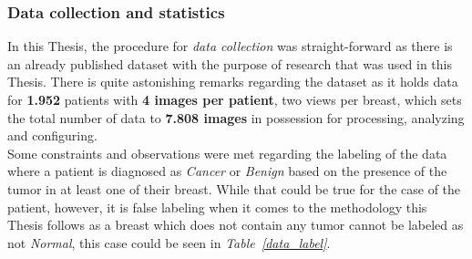 \documentclass[12pt]{extarticle}
\begin{document}
	\subsubsection{Data collection and statistics}\label{Data_collection}
	In this Thesis, the procedure for \emph{data collection} was straight-forward as there is an already published dataset \cite{Dataset} with the purpose of research that was used in this Thesis. There is quite astonishing remarks regarding the dataset as it holds data for \textbf{1.952} patients with \textbf{4 images per patient}, two views per breast, which sets the total number of data to \textbf{7.808 images} in possession for processing, analyzing and configuring.\\[5mm]
	Some constraints and observations were met regarding the labeling of the data where a patient is diagnosed as \emph{Cancer} or \emph{Benign} based on the presence of the tumor in at least one of their breast. While that could be true for the case of the patient, however, it is false labeling when it comes to the methodology this Thesis follows as a breast which does not contain any tumor cannot be labeled as not \emph{Normal}, this case could be seen in \emph{Table~\ref{data_label}}.
\end{document}
